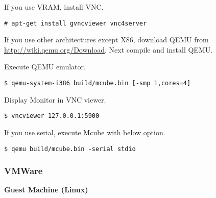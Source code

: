 If you use VRAM, install VNC.

\noindent
\begin{Sbox}
\begin{minipage}[t]{0.975\linewidth}
\begin{verbatim}
# apt-get install gvncviewer vnc4server
\end{verbatim}
\end{minipage}
\end{Sbox}
\fbox{\TheSbox}

If you use other architectures except X86, download QEMU from
\url{http://wiki.qemu.org/Download}.
Next compile and install QEMU.


Execute QEMU emulator.

\noindent
\begin{Sbox}
\begin{minipage}[t]{0.975\linewidth}
\begin{verbatim}
$ qemu-system-i386 build/mcube.bin [-smp 1,cores=4]
\end{verbatim}
\end{minipage}
\end{Sbox}
\fbox{\TheSbox}

Display Monitor in VNC viewer.

\noindent
\begin{Sbox}
\begin{minipage}[t]{0.975\linewidth}
\begin{verbatim}
$ vncviewer 127.0.0.1:5900
\end{verbatim}
\end{minipage}
\end{Sbox}
\fbox{\TheSbox}


If you use serial, execute Mcube with below option.

\noindent
\begin{Sbox}
\begin{minipage}[t]{0.975\linewidth}
\begin{verbatim}
$ qemu build/mcube.bin -serial stdio
\end{verbatim}
\end{minipage}
\end{Sbox}
\fbox{\TheSbox}



\subsubsection*{VMWare}


\textbf{Guest Machine (Linux)}

